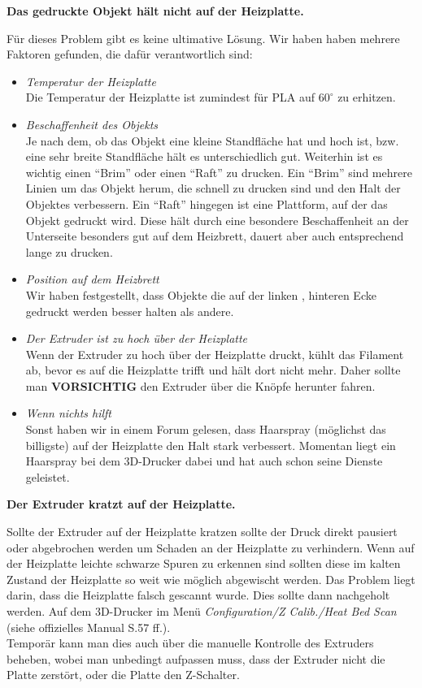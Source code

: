 \documentclass[11pt,a4paper]{scrartcl}
\begin{document}
\begin{description}
\item \textbf{Das gedruckte Objekt hält nicht auf der Heizplatte.}\\
Für dieses Problem gibt es keine ultimative Lösung. Wir haben haben mehrere Faktoren gefunden, die dafür verantwortlich sind:
\begin{itemize}
\item \textit{Temperatur der Heizplatte}\\
Die Temperatur der Heizplatte ist zumindest für PLA auf $60^\circ$ zu erhitzen.
\item \textit{Beschaffenheit des Objekts}\\
Je nach dem, ob das Objekt eine kleine Standfläche hat und hoch ist, bzw. eine sehr breite Standfläche hält es unterschiedlich gut. Weiterhin ist es wichtig einen \enquote{Brim} oder einen \enquote{Raft} zu drucken. Ein \enquote{Brim} sind mehrere Linien um das Objekt herum, die schnell zu drucken sind und den Halt der Objektes verbessern. Ein \enquote{Raft} hingegen ist eine Plattform, auf der das Objekt gedruckt wird. Diese hält durch eine besondere Beschaffenheit an der Unterseite besonders gut auf dem Heizbrett, dauert aber auch entsprechend lange zu drucken.
\item \textit{Position auf dem Heizbrett}\\
Wir haben festgestellt, dass Objekte die auf der linken , hinteren Ecke gedruckt werden besser halten als andere.
\item \textit{Der Extruder ist zu hoch über der Heizplatte}\\
Wenn der Extruder zu hoch über der Heizplatte druckt, kühlt das Filament ab, bevor es auf die Heizplatte trifft und hält dort nicht mehr. Daher sollte man \textbf{VORSICHTIG} den Extruder über die Knöpfe herunter fahren.
\item \textit{Wenn nichts hilft}\\
Sonst haben wir in einem Forum gelesen, dass Haarspray (möglichst das billigste) auf der Heizplatte den Halt stark verbessert. Momentan liegt ein Haarspray bei dem 3D-Drucker dabei und hat auch schon seine Dienste geleistet.
\end{itemize}

\item \textbf{Der Extruder kratzt auf der Heizplatte.}\\
Sollte der Extruder auf der Heizplatte kratzen sollte der Druck direkt pausiert oder abgebrochen werden um Schaden an der Heizplatte zu verhindern. Wenn auf der Heizplatte leichte schwarze Spuren zu erkennen sind sollten diese im kalten Zustand der Heizplatte so weit wie möglich abgewischt werden. Das Problem liegt darin, dass die Heizplatte falsch gescannt wurde. Dies sollte dann nachgeholt werden. Auf dem 3D-Drucker im Menü \textit{Configuration/Z Calib./Heat Bed Scan} (siehe offizielles Manual S.57 ff.).\\
Temporär kann man dies auch über die manuelle Kontrolle des Extruders beheben, wobei man unbedingt aufpassen muss, dass der Extruder nicht die Platte zerstört, oder die Platte den Z-Schalter.


\end{description}
\end{document}
